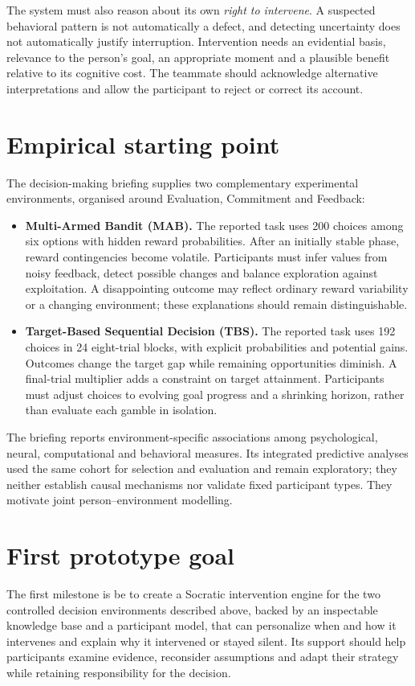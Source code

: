 \documentclass[11pt,a4paper]{article}
\begin{document}
The system must also reason about its own \emph{right to intervene}. A suspected behavioral pattern is not automatically a defect, and detecting uncertainty does not automatically justify interruption. Intervention needs an evidential basis, relevance to the person's goal, an appropriate moment and a plausible benefit relative to its cognitive cost. The teammate should acknowledge alternative interpretations and allow the participant to reject or correct its account.

\section{Empirical starting point}
The decision-making briefing supplies two complementary experimental environments, organised around Evaluation, Commitment and Feedback:
\begin{itemize}
\item \textbf{Multi-Armed Bandit (MAB).} The reported task uses 200 choices among six options with hidden reward probabilities. After an initially stable phase, reward contingencies become volatile. Participants must infer values from noisy feedback, detect possible changes and balance exploration against exploitation. A disappointing outcome may reflect ordinary reward variability or a changing environment; these explanations should remain distinguishable.
\item \textbf{Target-Based Sequential Decision (TBS).} The reported task uses 192 choices in 24 eight-trial blocks, with explicit probabilities and potential gains. Outcomes change the target gap while remaining opportunities diminish. A final-trial multiplier adds a constraint on target attainment. Participants must adjust choices to evolving goal progress and a shrinking horizon, rather than evaluate each gamble in isolation.
\end{itemize}
The briefing reports environment-specific associations among psychological, neural, computational and behavioral measures. Its integrated predictive analyses used the same cohort for selection and evaluation and remain exploratory; they neither establish causal mechanisms nor validate fixed participant types. They motivate joint person--environment modelling.

\section{First prototype goal}
The first milestone is be to create a Socratic intervention engine for the two controlled decision environments described above, backed by an inspectable knowledge base and a participant model, that can personalize when and how it intervenes and explain why it intervened or stayed silent. Its support should help participants examine evidence, reconsider assumptions and adapt their strategy while retaining responsibility for the decision.
\end{document}
